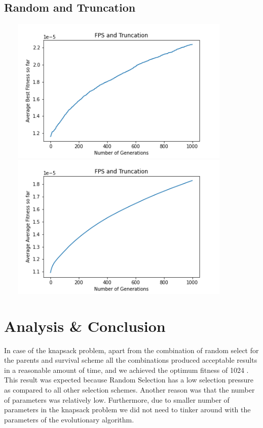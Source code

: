 \documentclass[a4paper]{article}
\begin{document}
\subsection{Random and Truncation}
\includegraphics[width=12cm, height=7cm]{Graphs/TSP/fps_trunc_bsf.png} \\
\includegraphics[width=12cm, height=7cm]{Graphs/TSP/fps_trunc_avg.png} \\

\section{Analysis \& Conclusion}

In case of the knapsack problem, apart from the combination of random select for the parents and survival scheme all the combinations produced acceptable results in a reasonable amount of time, and we achieved the optimum fitness of 1024 .  
This result was expected because Random Selection has a low selection pressure as compared to all other selection schemes.  Another reason was that the number of parameters was relatively low. Furthermore, due to smaller number of
parameters in the knapsack problem we did not need to tinker around with the parameters of the evolutionary algorithm.\newline
\end{document}
